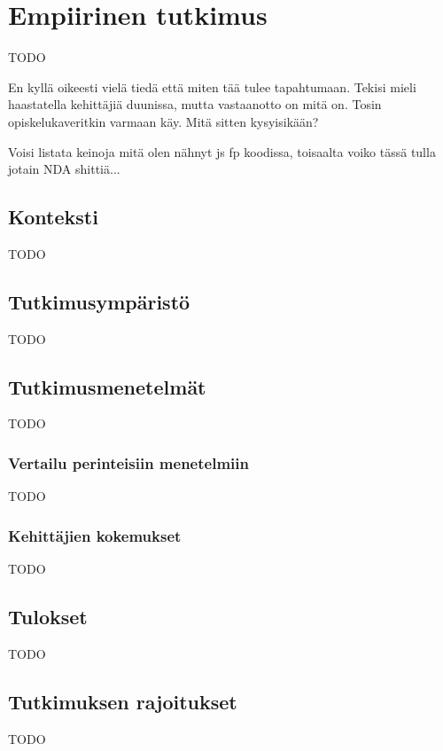 \vspace{21.5pt}
\chapter{Empiirinen tutkimus}
TODO

En kyllä oikeesti vielä tiedä että miten tää tulee tapahtumaan. Tekisi mieli haastatella kehittäjiä duunissa, mutta vastaanotto on mitä on. Tosin opiskelukaveritkin varmaan käy. Mitä sitten kysyisikään?

Voisi listata keinoja mitä olen nähnyt \gls{js} \gls{fp} koodissa, toisaalta voiko tässä tulla jotain NDA shittiä...

\section{Konteksti}

TODO

\section{Tutkimusympäristö}

TODO

\section{Tutkimusmenetelmät}

TODO
\subsection{Vertailu perinteisiin menetelmiin}

TODO

\subsection{Kehittäjien kokemukset}

TODO

\section{Tulokset}

TODO

\section{Tutkimuksen rajoitukset}

TODO